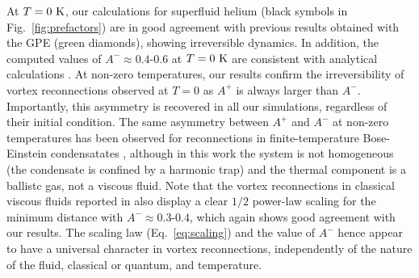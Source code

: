 \documentclass[%
 reprint,
 amsmath,amssymb,
 aps,
 prl,
]{revtex4-2}
\def\red#1{\textcolor{red}{#1}}
\begin{document}
At $T=0~{\rm K}$, our calculations for superfluid helium 
(black symbols in Fig.~\ref{fig:prefactors}) are in good agreement 
with previous results obtained with the GPE \cite{villoisIrreversibleDynamicsVortex2020}
(green diamonds), showing irreversible dynamics. In addition, the computed values of $A^-\approx 0.4$-$0.6$ at $T=0~{\rm K}$
are consistent with analytical calculations \cite{boue-etal-2013,rica-2019}. 
At non-zero temperatures, our results confirm the irreversibility of vortex reconnections 
observed at $T=0$ as $A^+$ is always larger than $A^-$. Importantly, this asymmetry 
is recovered in all our simulations, regardless of their initial condition.
The same asymmetry between
$A^+$ and $A^-$ at non-zero temperatures has been observed for reconnections in finite-temperature
Bose-Einstein condensatates \cite{allen2014}, although in this work the system
is not homogeneous (the condensate is confined by a harmonic trap) and the
thermal component is a ballistc gas, not a viscous fluid.
Note that the vortex reconnections in classical viscous fluids reported in %
\cite{yaoSeparationScalingViscous2020} also display
a clear $1/2$ power-law scaling for the minimum distance
with $A^- \approx 0.3$-$0.4$, which again shows good agreement with our
results. The scaling law (Eq.~\ref{eq:scaling}) and the value of $A^-$ hence appear to have a universal character in vortex reconnections, independently of the nature
of the fluid, classical or quantum, and temperature.


\end{document}
